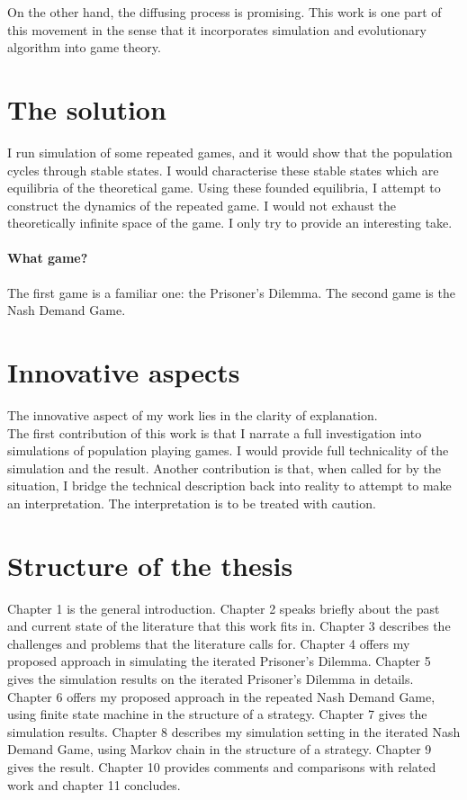 \documentclass[12.5pt]{report}
\begin{document}
On the other hand, the diffusing process is promising. This work is one part of this movement in the sense that it incorporates simulation and evolutionary algorithm into game theory.

\section{The solution}
I run simulation of some repeated games, and it would show that the population cycles through stable states. I would characterise these stable states which are equilibria of the theoretical game. Using these founded equilibria, I attempt to construct the dynamics of the repeated game. I would not exhaust the theoretically infinite space of the game. I only try to provide an interesting take.

\paragraph{What game?}
The first game is a familiar one: the Prisoner's Dilemma. The second game is the Nash Demand Game.

\section{Innovative aspects}
The innovative aspect of my work lies in the clarity of explanation.\\

The first contribution of this work is that I narrate a full investigation into simulations of population playing games. I would provide full technicality of the simulation and the result. Another contribution is that, when called for by the situation, I bridge the technical description back into reality to attempt to make an interpretation. The interpretation is to be treated with caution.\\

\section{Structure of the thesis}
Chapter 1 is the general introduction. Chapter 2 speaks briefly about the past and current state of the literature that this work fits in. Chapter 3 describes the challenges and problems that the literature calls for. Chapter 4 offers my proposed approach in simulating the iterated Prisoner's Dilemma. Chapter 5 gives the simulation results on the iterated Prisoner's Dilemma in details. Chapter 6 offers my proposed approach in the repeated Nash Demand Game, using finite state machine in the structure of a strategy. Chapter 7 gives the simulation results. Chapter 8 describes my simulation setting in the iterated Nash Demand Game, using Markov chain in the structure of a strategy. Chapter 9 gives the result. Chapter 10 provides comments and comparisons with related work and chapter 11 concludes. 
\end{document}

